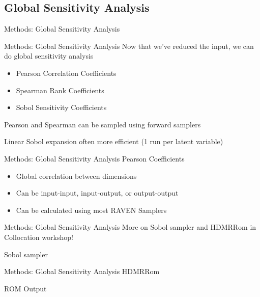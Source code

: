 \documentclass[t,9pt,svgnames]{beamer}
\begin{document}
\subsection{Global Sensitivity Analysis}
\begin{frame}{Methods: Global Sensitivity Analysis}
\end{frame}

\begin{frame}{Methods: Global Sensitivity Analysis}
  \vfill
  Now that we've reduced the input, we can do global sensitivity analysis
  \vfill
  \begin{itemize}
    \item Pearson Correlation Coefficients
  \vfill
    \item Spearman Rank Coefficients
  \vfill
    \item Sobol Sensitivity Coefficients
  \end{itemize}
  \vfill
  Pearson and Spearman can be sampled using forward samplers
  \vfill

  Linear Sobol expansion often more efficient (1 run per latent variable)
  \vfill
\end{frame}

\begin{frame}{Methods: Global Sensitivity Analysis}
  \vfill
  Pearson Coefficients
  \vfill
  \begin{itemize}
    \item Global correlation between dimensions
  \vfill
    \item Can be input-input, input-output, or output-output
  \vfill
    \item Can be calculated using most RAVEN Samplers
  \end{itemize}
  \vfill
\end{frame}

\begin{frame}[fragile]{Methods: Global Sensitivity Analysis}
  \vfill
  More on Sobol sampler and HDMRRom in Collocation workshop!
  \vfill

  Sobol sampler
  
  \vfill
\end{frame}

\begin{frame}[fragile]{Methods: Global Sensitivity Analysis}
  \vfill
  HDMRRom
  
  \vfill
  ROM Output
  
  \vfill
\end{frame}
\end{document}
